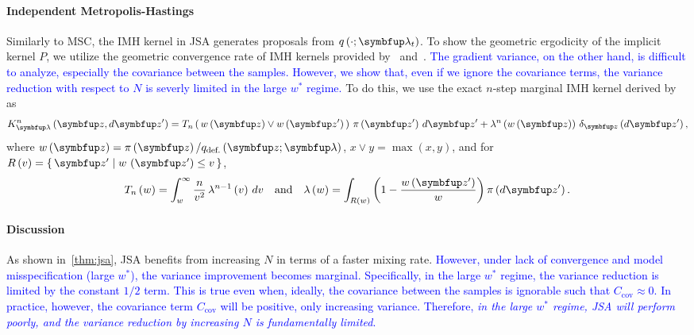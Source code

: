 \paragraph{Independent Metropolis-Hastings}
Similarly to MSC, the IMH kernel in JSA generates proposals from \(q\left(\cdot; \vlambda_t\right)\).
To show the geometric ergodicity of the implicit kernel \(P\), we utilize the geometric convergence rate of IMH kernels provided by~\citet[Theorem 2.1]{10.2307/2242610} and~\citet{wang_exact_2022}.
\textcolor{blue}{
The gradient variance, on the other hand, is difficult to analyze, especially the covariance between the samples.
However, we show that, even if we ignore the covariance terms, the variance reduction with respect to \(N\) is severly limited in the large \(w^*\) regime.
}
To do this, we use the exact \(n\)-step marginal IMH kernel derived by~\citet{Smith96exacttransition} as
{
  \begin{align}
  K^n_{\vlambda}\left(\vz, d\vz^{\prime}\right) 
  = T_n\left(\, w\left(\vz\right) \vee w\left(\vz^{\prime}\right)\,\right) \, \pi\left(\vz^{\prime}\right) \, d\vz^{\prime}
  + \lambda^n\left(w\left(\vz\right)\right) \, \delta_{\vz}\left(d\vz^{\prime}\right),
  \label{eq:imh_exact_kernel}
  \end{align}
}%
where {\(w\left(\vz\right) = \pi\left(\vz\right)/q_{\text{def.}}\left(\vz; \vlambda\right)\), \(x \vee y = \max\left(x, y\right)\)}, and for {\(R\left(v\right) = \{\, \vz^{\prime} \mid w\,\left(\vz^{\prime}\right) \leq v \,\}\)}, 
{%
  \begin{align}
    T_n\left(w\right)      = \int_w^{\infty}
    \frac{n}{v^2}
    \, \lambda^{n-1}\left(v\right)\,dv
    \quad\text{and}\quad
    \lambda\left(w\right) =
    \int_{R\left(w\right)}
    \left( 1 - \frac{w\left(\vz^{\prime}\right)}{w}  \right)
    \pi\left(d\vz^{\prime}\right).\label{eq:T_lambda}
  \end{align}
}%


%
\vspace{-1.5ex}
\paragraph{Discussion}
As shown in~\cref{thm:jsa}, JSA benefits from increasing \(N\) in terms of a faster mixing rate.
\textcolor{blue}{
However,  under lack of convergence and model misspecification (large \(w^*\)), the variance improvement becomes marginal.
Specifically, in the large \(w^*\) regime, the variance reduction is limited by the constant \(1/2\) term.
This is true even when, ideally, the covariance between the samples is ignorable such that \(C_{\text{cov}} \approx 0\).
In practice, however, the covariance term \(C_{\text{cov}}\) will be positive, only increasing variance.
Therefore, \textit{in the large \(w^*\) regime, JSA will perform poorly, and the variance reduction by increasing \(N\) is fundamentally limited}.
}

